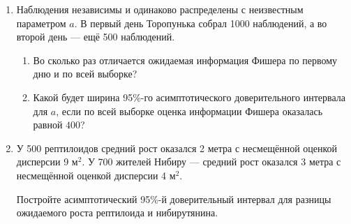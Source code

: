 \documentclass[12pt]{article}
\begin{document}
\begin{enumerate}
\item Наблюдения независимы и одинаково распределены с неизвестным параметром $a$.
В первый день Торопунька собрал 1000 наблюдений, 
а во второй день — ещё 500 наблюдений.

\begin{enumerate}
    \item Во сколько раз отличается ожидаемая информация Фишера по первому дню и по всей выборке?
    \item Какой будет ширина 95\%-го асимптотического доверительного интервала для $a$, если
    по всей выборке оценка информации Фишера оказалась равной $400$?
\end{enumerate}

\item У 500 рептилоидов средний рост оказался 2 метра с несмещённой оценкой дисперсии 9 м$^2$.
У 700 жителей Нибиру — средний рост оказался 3 метра с несмещённой оценкой дисперсии 4 м$^2$.

Постройте асимптотический 95\%-й доверительный интервал для разницы ожидаемого роста рептилоида и нибирутянина.

\end{enumerate}
\end{document}
